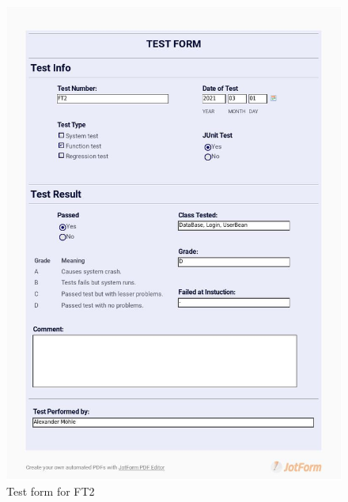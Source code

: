 \documentclass{article}
\begin{document}
 \begin{figure}
     \centering
     \includegraphics[width=13cm]{images/2021-03-01_Alexander_FT2_001}
     \renewcommand\figurename{Figure}
     \caption{Test form for FT2}
     \label{fig:my_label}
 \end{figure}
 
\end{document}
